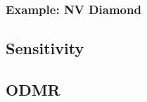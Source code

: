 \subsubsection{Example: NV Diamond}


\subsection{Sensitivity}
\cite{RevModPhys.92.015004}

\cite{PhysRevApplied.4.014009}


\cite{PhysRevApplied.15.064022}

\cite{PhysRevResearch.2.023394}


\cite{Castelletto2019}

\cite{Zhou2023}

\subsection{ODMR}
\cite{PhysRevB.101.064102}


